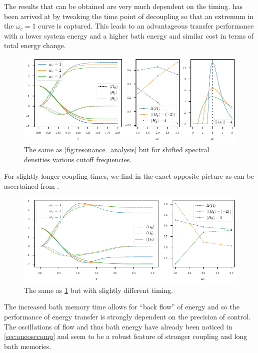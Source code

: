 The results that can be obtained are very much dependent on the
timing.  has been arrived at by tweaking the
time point of decoupling so that an extremum in the \(ω_{c}=1\) curve
is captured. This leads to an advantageous transfer performance with a
lower system energy and a higher bath energy and similar cost in terms
of total energy change.
\begin{figure}[h]
  \centering
  \includegraphics{figs/one_bath_syst/markov_analysis}
  \caption{\label{fig:markov_analysis} The same as
    \cref{fig:resonance_analysis} but for shifted spectral densities
    various cutoff frequencies.}
\end{figure}

For slightly longer coupling times, we find in
the exact opposite picture as can be ascertained from .
\begin{figure}[h]
  \centering
  \includegraphics{figs/one_bath_syst/markov_analysis_longer}
  \caption{\label{fig:markov_analysis_longer} The same as
    \cref{fig:markov_analysis} but with slightly different timing.}
\end{figure}
The increased bath memory time allows for ``back flow'' of energy and
so the performance of energy transfer is strongly dependent on the
precision of control. The oscillations of flow and thus bath energy
have already been noticed in \cref{sec:oneosccomp} and seem to be a
robust feature of stronger coupling and long bath
memories. 

